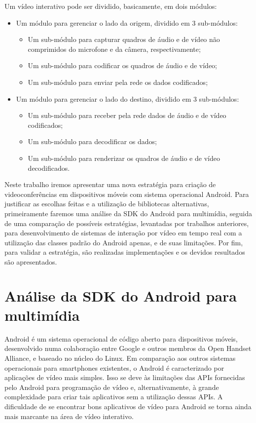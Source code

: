 \documentclass{acm_proc_article-sp}
\begin{document}
Um vídeo interativo pode ser dividido, basicamente, em dois módulos:
\begin{itemize}
 \item Um módulo para gerenciar o lado da origem, dividido em 3 sub-módulos:
 \begin{itemize}
  \item Um sub-módulo para capturar quadros de áudio e de vídeo não comprimidos do microfone e da câmera, respectivamente;
  \item Um sub-módulo para codificar os quadros de áudio e de vídeo;
  \item Um sub-módulo para enviar pela rede os dados codificados;
 \end{itemize}
 \item Um módulo para gerenciar o lado do destino, dividido em 3 sub-módulos:
 \begin{itemize}
  \item Um sub-módulo para receber pela rede dados de áudio e de vídeo codificados;
  \item Um sub-módulo para decodificar os dados;
  \item Um sub-módulo para renderizar os quadros de áudio e de vídeo decodificados.
 \end{itemize}
\end{itemize}

Neste trabalho iremos apresentar uma nova estratégia para criação de videoconferências em dispositivos móveis com sistema operacional Android. Para justificar as escolhas feitas e a utilização de bibliotecas alternativas, primeiramente faremos uma análise da SDK do Android para multimídia, seguida de uma comparação de possíveis estratégias, levantadas por trabalhos anteriores, para desenvolvimento de sistemas de interação por vídeo em tempo real com a utilização das classes padrão do Android apenas, e de suas limitações. Por fim, para validar a estratégia, são realizadas implementações e os devidos resultados são apresentados.

\section{Análise da SDK do Android para multimídia}

Android é um sistema operacional de código aberto para dispositivos móveis, desenvolvido numa colaboração entre Google e outros membros da Open Handset Alliance, e baseado no núcleo do Linux. Em comparação aos outros sistemas operacionais para smartphones existentes, o Android é caracterizado por aplicações de vídeo mais simples. Isso se deve às limitações das APIs fornecidas pelo Android para programação de vídeo e, alternativamente, à grande complexidade para criar tais aplicativos sem a utilização dessas APIs. A dificuldade de se encontrar bons aplicativos de vídeo para Android se torna ainda mais marcante na área de vídeo interativo.
\end{document}
